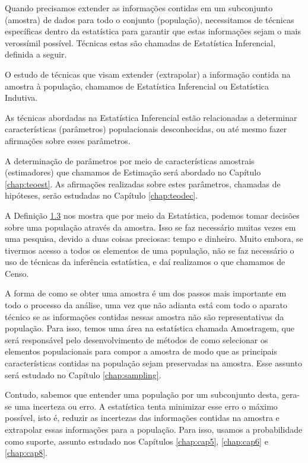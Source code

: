 \documentclass[
]{book}
\begin{document}
Quando precisamos extender as informações contidas em um subconjunto (amostra) de dados para todo o conjunto (população), necessitamos de técnicas específicas dentro da estatística para garantir que estas informações sejam o mais verossímil possível. Técnicas estas são chamadas de Estatística Inferencial, definida a seguir.

\leavevmode\hypertarget{def:estinf}{}%
O estudo de técnicas que visam extender (extrapolar) a informação contida na amostra à população, chamamos de Estatística Inferencial ou Estatística Indutiva.

As técnicas abordadas na Estatística Inferencial estão relacionadas a determinar características (parâmetros) populacionais desconhecidas, ou até mesmo fazer afirmações sobre esses parâmetros.

A determinação de parâmetros por meio de características amostrais (estimadores) que chamamos de Estimação será abordado no Capítulo \ref{chap:teoest}. As afirmações realizadas sobre estes parâmetros, chamadas de hipóteses, serão estudadas no Capítulo \ref{chap:teodec}.

A Definição \protect\hyperlink{def:estinf}{1.3} nos mostra que por meio da Estatística, podemos tomar decisões sobre uma população através da amostra. Isso se faz necessário muitas vezes em uma pesquisa, devido a duas coisas preciosas: tempo e dinheiro. Muito embora, se tivermos acesso a todos os elementos de uma população, não se faz necessário o uso de técnicas da inferência estatística, e daí realizamos o que chamamos de Censo.

A forma de como se obter uma amostra é um dos passos mais importante em todo o processo da análise, uma vez que não adianta está com todo o aparato técnico se as informações contidas nessas amostra não são representativas da população. Para isso, temos uma área na estatística chamada Amostragem, que será responsável pelo desenvolvimento de métodos de como selecionar os elementos populacionais para compor a amostra de modo que as principais características contidas na população sejam preservadas na amostra. Esse assunto será estudado no Capítulo \ref{chap:sampling}.

Contudo, sabemos que entender uma população por um subconjunto desta, gera-se uma incerteza ou erro. A estatística tenta minimizar esse erro o máximo possível, isto é, reduzir as incertezas das informações contidas na amostra e extrapolar essas informações para a população. Para isso, usamos a probabilidade como suporte, assunto estudado nos Capítulos \ref{chap:cap5}, \ref{chap:cap6} e \ref{chap:cap8}.
\end{document}
